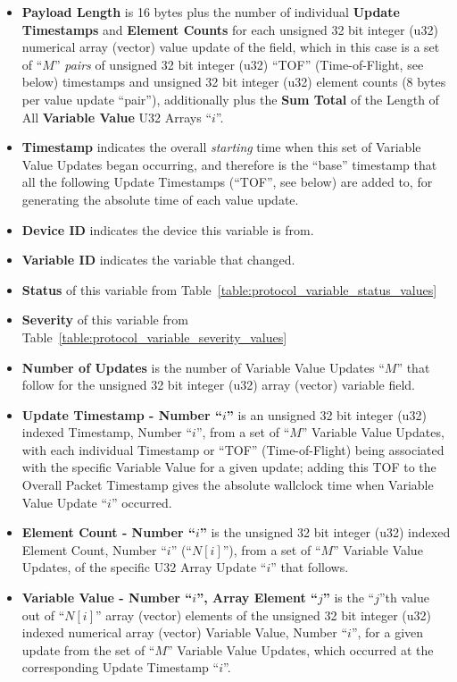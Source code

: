 \begin{itemize}
\item{\bf Payload Length} is 16 bytes plus the number
of individual {\bf Update Timestamps} and {\bf Element Counts}
for each unsigned 32 bit integer (u32) numerical array (vector)
value update of the field,
which in this case is a set of ``$M$'' {\it pairs} of
unsigned 32 bit integer (u32) ``TOF'' (Time-of-Flight, see below)
timestamps
and unsigned 32 bit integer (u32) element counts
(8 bytes per value update ``pair''),
additionally plus the {\bf Sum Total} of the Length of All
{\bf Variable Value} U32 Arrays ``$i$''.
\item{\bf Timestamp} indicates the overall {\it starting} time when
this set of Variable Value Updates began occurring,
and therefore is the ``base'' timestamp that
all the following Update Timestamps (``TOF'', see below)
are added to, for generating the absolute time of each value update.
\item{\bf Device ID} indicates the device this variable is from.
\item{\bf Variable ID} indicates the variable that changed.
\item{\bf Status} of this variable from
Table~\ref{table:protocol_variable_status_values}
\item{\bf Severity} of this variable from
Table~\ref{table:protocol_variable_severity_values}
\item{\bf Number of Updates}
is the number of Variable Value Updates ``$M$'' that follow
for the unsigned 32 bit integer (u32) array (vector) variable field.
\item{\bf Update Timestamp - Number ``$i$''} is an
unsigned 32 bit integer (u32) indexed Timestamp, Number ``$i$'',
from a set of ``$M$'' Variable Value Updates,
with each individual Timestamp or ``TOF'' (Time-of-Flight)
being associated with the specific Variable Value for a given update;
adding this TOF to the Overall Packet Timestamp gives the
absolute wallclock time when Variable Value Update ``$i$'' occurred.
\item{\bf Element Count - Number ``$i$''} is the
unsigned 32 bit integer (u32) indexed Element Count, Number ``$i$''
(``$N[i]$''),
from a set of ``$M$'' Variable Value Updates,
of the specific U32 Array Update ``$i$'' that follows.
\item{\bf Variable Value - Number ``$i$'', Array Element ``$j$''} is
the ``$j$''th value out of ``$N[i]$'' array (vector) elements
of the unsigned 32 bit integer (u32) indexed numerical array (vector)
Variable Value, Number ``$i$'',
for a given update from the set of ``$M$'' Variable Value Updates,
which occurred at the corresponding Update Timestamp ``$i$''.
\end{itemize}


